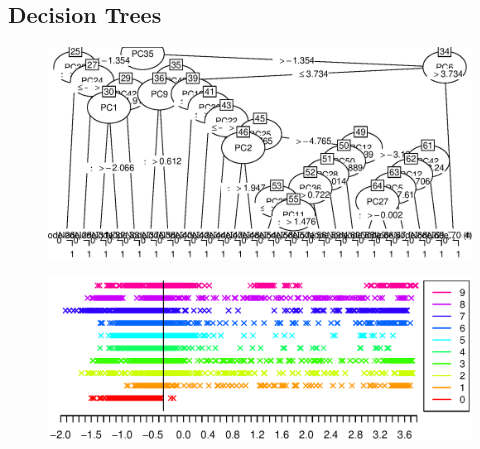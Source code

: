 \subsection{Decision Trees}

\begin{figure}[H]
\includegraphics[width = \textwidth]{graphics/tree_section}
\end{figure}

\begin{figure}[H]
\includegraphics[width = \textwidth]{graphics/decision_seperation}
\end{figure}


\begin{table}[H]
\begin{tabular}{*{11}{c}}

\end{tabular}

\end{table}
